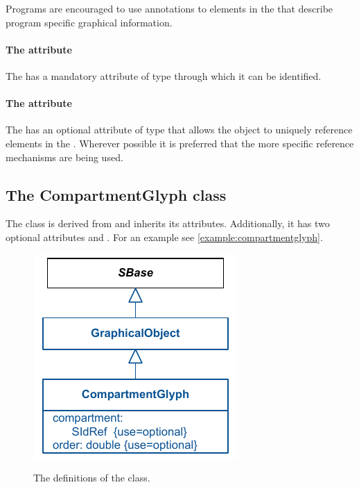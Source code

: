Programs are encouraged to use annotations to \GraphicalObject elements 
in the  that describe program 
specific graphical information. 



\paragraph{The  attribute}
The \GraphicalObject has a mandatory  attribute of type 
 through which it can be identified. 


\paragraph{The  attribute}
The \GraphicalObject has an optional  attribute of type 
 that allows the object to uniquely reference elements in the \Model. 
Wherever possible it is preferred that the more specific reference 
mechanisms are being used. 


\subsection{The CompartmentGlyph class }
\label{compartmentglyph-class}
The \CompartmentGlyph class is derived from \GraphicalObject and inherits its attributes. Additionally, it has two optional attributes 
 and . For an example see \ref{example:compartmentglyph}.


\begin{figure}[!h]
\includegraphics{uml/layout-compartmentglyph-uml}\\
\label{uml:compartmentglyph}
\caption{The definitions of the \CompartmentGlyph class.}
\end{figure}


